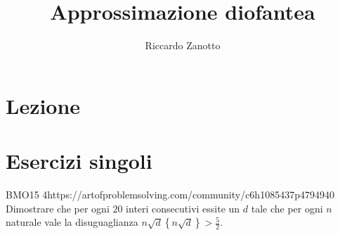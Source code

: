 \documentclass[12pt]{article}
\author{Riccardo Zanotto}
\title{Approssimazione diofantea}
\begin{document}
\maketitle

\section{Lezione}

\section{Esercizi singoli}

\begin{esercizio}{BMO15 4}{https://artofproblemsolving.com/community/c6h1085437p4794940}
    Dimostrare che per ogni $20$ interi consecutivi essite un $d$ tale che per ogni $n$ naturale vale la disuguaglianza $n\sqrt d\left\{ n\sqrt d \right\}>\frac 5 2$.
\end{esercizio}
\end{document}
